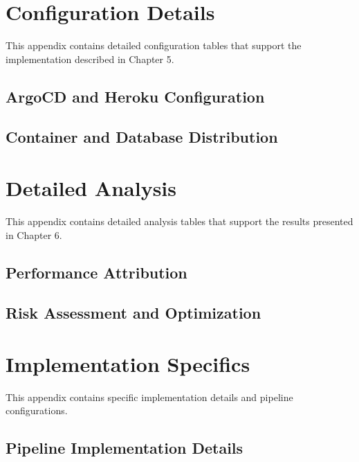 \appendix

\chapter{Configuration Details}
\label{appendix:configuration}

This appendix contains detailed configuration tables that support the implementation described in Chapter 5.

\section{ArgoCD and Heroku Configuration}


\section{Container and Database Distribution}


\chapter{Detailed Analysis}
\label{appendix:analysis}

This appendix contains detailed analysis tables that support the results presented in Chapter 6.

\section{Performance Attribution}


\section{Risk Assessment and Optimization}


\chapter{Implementation Specifics}
\label{appendix:implementation}

This appendix contains specific implementation details and pipeline configurations.

\section{Pipeline Implementation Details}

